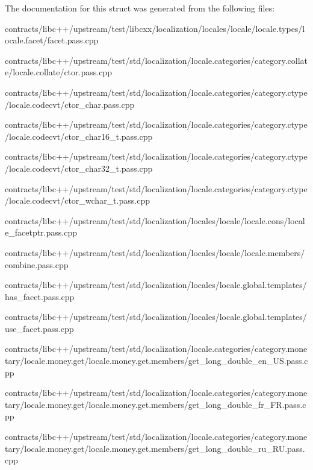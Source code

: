 The documentation for this struct was generated from the following files\+:\begin{DoxyCompactItemize}
\item 
contracts/libc++/upstream/test/libcxx/localization/locales/locale/locale.\+types/locale.\+facet/facet.\+pass.\+cpp\item 
contracts/libc++/upstream/test/std/localization/locale.\+categories/category.\+collate/locale.\+collate/ctor.\+pass.\+cpp\item 
contracts/libc++/upstream/test/std/localization/locale.\+categories/category.\+ctype/locale.\+codecvt/ctor\+\_\+char.\+pass.\+cpp\item 
contracts/libc++/upstream/test/std/localization/locale.\+categories/category.\+ctype/locale.\+codecvt/ctor\+\_\+char16\+\_\+t.\+pass.\+cpp\item 
contracts/libc++/upstream/test/std/localization/locale.\+categories/category.\+ctype/locale.\+codecvt/ctor\+\_\+char32\+\_\+t.\+pass.\+cpp\item 
contracts/libc++/upstream/test/std/localization/locale.\+categories/category.\+ctype/locale.\+codecvt/ctor\+\_\+wchar\+\_\+t.\+pass.\+cpp\item 
contracts/libc++/upstream/test/std/localization/locales/locale/locale.\+cons/locale\+\_\+facetptr.\+pass.\+cpp\item 
contracts/libc++/upstream/test/std/localization/locales/locale/locale.\+members/combine.\+pass.\+cpp\item 
contracts/libc++/upstream/test/std/localization/locales/locale.\+global.\+templates/has\+\_\+facet.\+pass.\+cpp\item 
contracts/libc++/upstream/test/std/localization/locales/locale.\+global.\+templates/use\+\_\+facet.\+pass.\+cpp\item 
contracts/libc++/upstream/test/std/localization/locale.\+categories/category.\+monetary/locale.\+money.\+get/locale.\+money.\+get.\+members/get\+\_\+long\+\_\+double\+\_\+en\+\_\+\+U\+S.\+pass.\+cpp\item 
contracts/libc++/upstream/test/std/localization/locale.\+categories/category.\+monetary/locale.\+money.\+get/locale.\+money.\+get.\+members/get\+\_\+long\+\_\+double\+\_\+fr\+\_\+\+F\+R.\+pass.\+cpp\item 
contracts/libc++/upstream/test/std/localization/locale.\+categories/category.\+monetary/locale.\+money.\+get/locale.\+money.\+get.\+members/get\+\_\+long\+\_\+double\+\_\+ru\+\_\+\+R\+U.\+pass.\+cpp\item 

\end{DoxyCompactItemize}
